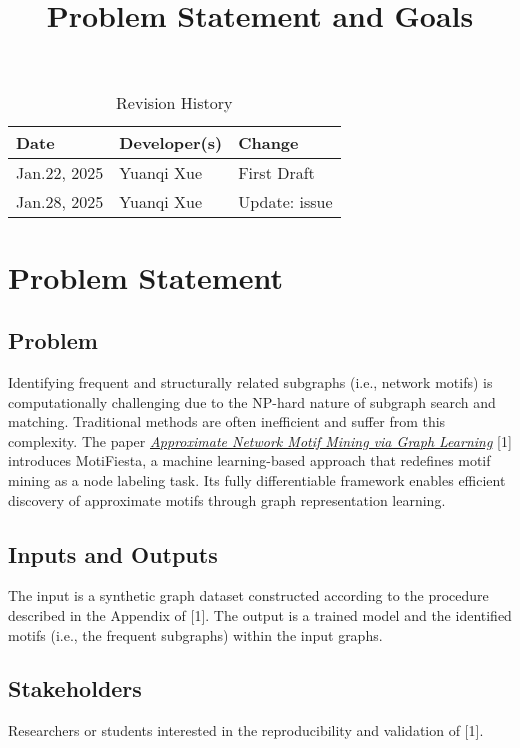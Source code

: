 \documentclass{article}
\title{Problem Statement and Goals}
\author{\authname}
\date{}
\begin{document}
\maketitle

\begin{table}[hp]
\caption{Revision History} \label{TblRevisionHistory}
\begin{tabularx}{\textwidth}{llX}
\toprule
\textbf{Date} & \textbf{Developer(s)} & \textbf{Change}\\
\midrule
Jan.22, 2025 & Yuanqi Xue & First Draft\\
Jan.28, 2025 & Yuanqi Xue & Update: issue #1\\
\bottomrule
\end{tabularx}
\end{table}

\section{Problem Statement}
\subsection{Problem}
Identifying frequent and structurally related subgraphs (i.e., network motifs) is computationally challenging due to the NP-hard nature of subgraph search and matching. Traditional methods are often inefficient and suffer from this complexity. The paper  \href{https://arxiv.org/abs/2206.01008}{\textit{Approximate Network Motif Mining via Graph Learning}} [1] introduces MotiFiesta, a machine learning-based approach that redefines motif mining as a node labeling task. Its fully differentiable framework enables efficient discovery of approximate motifs through graph representation learning.

\subsection{Inputs and Outputs}
The input is a synthetic graph dataset constructed according to the procedure described in the Appendix of [1]. The output is a trained model and the identified motifs (i.e., the frequent subgraphs) within the input graphs.


\subsection{Stakeholders}
Researchers or students interested in the reproducibility and validation of [1].
\end{document}
